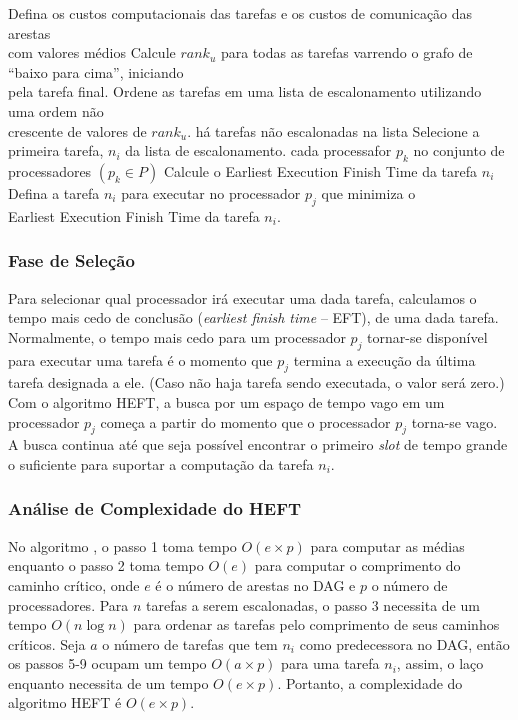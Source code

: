 \begin{codebox}
\li	Defina os custos computacionais das tarefas e os custos de comunicação das
	arestas \\com valores médios
\li	Calcule $rank_u$ para todas as tarefas varrendo o grafo de ``baixo para cima'',
	iniciando \\pela tarefa final.
\li Ordene as tarefas em uma lista de escalonamento utilizando uma ordem não \\
	crescente de valores de $rank_u$.
\li 	\While há tarefas não escalonadas na lista
\li 		\Do
				Selecione a primeira tarefa, $n_i$ da lista de escalonamento.
\li				\For cada processafor $p_k$ no conjunto de processadores $(p_k \in P)$
\li 				\Do
						Calcule o Earliest Execution Finish Time da tarefa $n_i$
					\End
\li				Defina a tarefa $n_i$ para executar no processador $p_j$ que
				minimiza o\\ Earliest	Execution Finish Time da tarefa $n_i$.
			\End
\End
\end{codebox}

\subsubsection{Fase de Seleção}
Para selecionar qual processador irá executar uma dada tarefa, calculamos o
tempo mais cedo de conclusão (\emph{earliest finish time} -- EFT), de uma dada
tarefa. Normalmente, o tempo mais cedo para um processador $p_j$ tornar-se
disponível para executar uma tarefa é o momento que $p_j$ termina a execução
da última tarefa designada a ele. (Caso não haja tarefa sendo executada, 
o valor será zero.) Com o algoritmo HEFT, a busca por um espaço de tempo vago
em um processador $p_j$ começa a partir do momento que o processador $p_j$ 
torna-se vago. A busca continua até que seja possível encontrar 
o primeiro \emph{slot} de tempo grande o suficiente para suportar a computação
da tarefa $n_i$.

\subsubsection{Análise de Complexidade do HEFT}
No algoritmo , o passo 1 toma tempo
$O(e \times p)$ para computar as médias enquanto o passo 2 toma tempo $O(e)$ para 
computar o comprimento do caminho crítico, onde $e$ é o número de arestas no 
DAG e $p$ o número de processadores. Para $n$ tarefas a serem escalonadas, 
o passo 3 necessita de um tempo $O(n \log n)$ para ordenar as tarefas pelo
comprimento de seus caminhos críticos. Seja $a$ o número de tarefas que tem
$n_i$ como predecessora no DAG, então os passos 5-9 ocupam um tempo
$O(a \times p)$ para uma tarefa $n_i$, assim, o laço enquanto necessita de um 
tempo $O(e \times p)$. Portanto, a complexidade do algoritmo HEFT é  $O(e
\times p)$.


